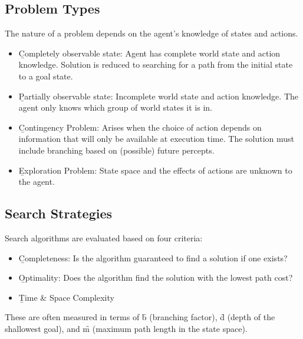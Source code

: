 \subsection{Problem Types}
The nature of a problem depends on the agent's knowledge of states and actions.
\begin{itemize}
     \item \b{Completely observable state:} Agent has complete world state and action knowledge. Solution is reduced to searching for a path from the initial state to a goal state.
     \item \b{Partially observable state:} Incomplete world state and action knowledge. The agent only knows which group of world states it is in.
     \item \b{Contingency Problem:} Arises when the choice of action depends on information that will only be available at execution time. The solution must include branching based on (possible) future percepts.
     \item \b{Exploration Problem:} State space and the effects of actions are unknown to the agent.
\end{itemize}
\newpage
\subsection{Search Strategies}
Search algorithms are evaluated based on four criteria:
\begin{itemize}
     \item \b{Completeness:} Is the algorithm guaranteed to find a solution if one exists? 
     \item \b{Optimality:} Does the algorithm find the solution with the lowest path cost? 
     \item \b{Time \& Space Complexity}
\end{itemize}
These are often measured in terms of \f{b} (branching factor), \f{d} (depth of the shallowest goal), and \f{m} (maximum path length in the state space).

